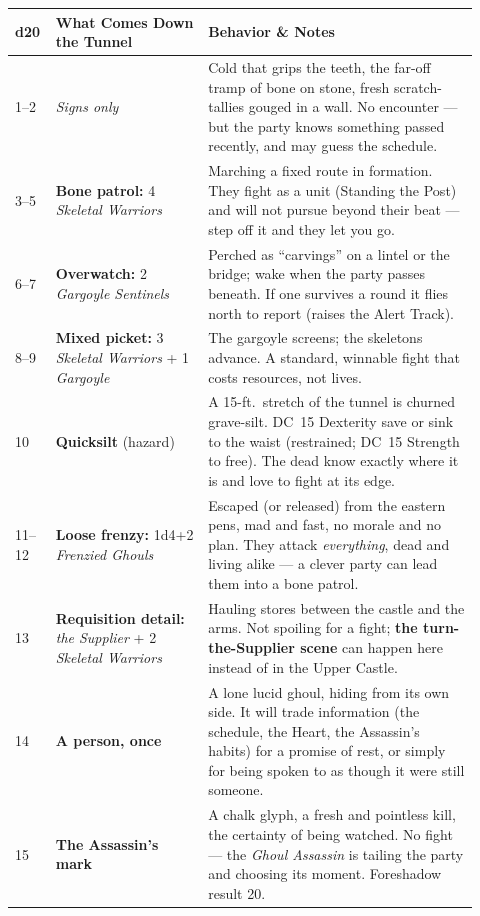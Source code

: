 \documentclass[10pt,twoside]{report}
\newcommand{\dc}[1]{DC~#1}
\begin{document}
\renewcommand{\arraystretch}{1.2}
\begin{longtable}{@{}p{0.06\linewidth} p{0.31\linewidth} p{0.55\linewidth}@{}}
\toprule
\textbf{\color{gukred}d20} & \textbf{\color{gukred}What Comes Down the Tunnel} & \textbf{\color{gukred}Behavior \& Notes} \\
\midrule
\endhead
1--2 & \textit{Signs only} & Cold that grips the teeth, the far-off tramp of bone on stone, fresh scratch-tallies gouged in a wall. No encounter --- but the party knows something passed recently, and may guess the schedule. \\
3--5 & \textbf{Bone patrol:} 4 \emph{Skeletal Warriors} & Marching a fixed route in formation. They fight as a unit (Standing the Post) and will not pursue beyond their beat --- step off it and they let you go. \\
6--7 & \textbf{Overwatch:} 2 \emph{Gargoyle Sentinels} & Perched as ``carvings'' on a lintel or the bridge; wake when the party passes beneath. If one survives a round it flies north to report (raises the Alert Track). \\
8--9 & \textbf{Mixed picket:} 3 \emph{Skeletal Warriors} + 1 \emph{Gargoyle} & The gargoyle screens; the skeletons advance. A standard, winnable fight that costs resources, not lives. \\
10 & \textbf{Quicksilt} (hazard) & A 15-ft.\ stretch of the tunnel is churned grave-silt. \dc{15} Dexterity save or sink to the waist (restrained; \dc{15} Strength to free). The dead know exactly where it is and love to fight at its edge. \\
11--12 & \textbf{Loose frenzy:} 1d4+2 \emph{Frenzied Ghouls} & Escaped (or released) from the eastern pens, mad and fast, no morale and no plan. They attack \emph{everything}, dead and living alike --- a clever party can lead them into a bone patrol. \\
13 & \textbf{Requisition detail:} \emph{the Supplier} + 2 \emph{Skeletal Warriors} & Hauling stores between the castle and the arms. Not spoiling for a fight; \textbf{the turn-the-Supplier scene} can happen here instead of in the Upper Castle. \\
14 & \textbf{A person, once} & A lone lucid ghoul, hiding from its own side. It will trade information (the schedule, the Heart, the Assassin's habits) for a promise of rest, or simply for being spoken to as though it were still someone. \\
15 & \textbf{The Assassin's mark} & A chalk glyph, a fresh and pointless kill, the certainty of being watched. No fight --- the \emph{Ghoul Assassin} is tailing the party and choosing its moment. Foreshadow result 20. \\

\end{longtable}
\end{document}
